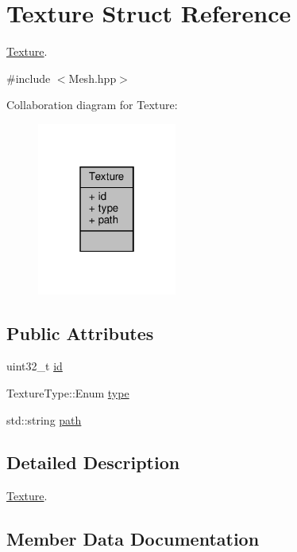 \hypertarget{struct_texture}{}\section{Texture Struct Reference}
\label{struct_texture}


\hyperlink{struct_texture}{Texture}.  




{\ttfamily \#include $<$Mesh.\+hpp$>$}



Collaboration diagram for Texture\+:
\nopagebreak
\begin{figure}[H]
\begin{center}
\leavevmode
\includegraphics[width=130pt]{struct_texture__coll__graph}
\end{center}
\end{figure}
\subsection*{Public Attributes}
\begin{DoxyCompactItemize}
\item 
uint32\+\_\+t \hyperlink{struct_texture_ac6a13250a07e635d783cb451c478de9d}{id}
\item 
Texture\+Type\+::\+Enum \hyperlink{struct_texture_a789fcb5f3b658f319b53d66da4005b47}{type}
\item 
std\+::string \hyperlink{struct_texture_aa8ba4ade408b0df1fc9b6f605a4efd22}{path}
\end{DoxyCompactItemize}


\subsection{Detailed Description}
\hyperlink{struct_texture}{Texture}. 

\subsection{Member Data Documentation}
\mbox{\label{struct_texture_ac6a13250a07e635d783cb451c478de9d}} 
